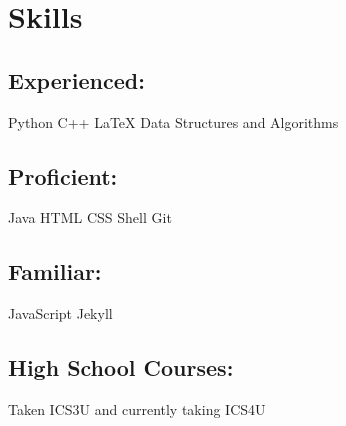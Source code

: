 \section{Skills}
\subsection{Experienced:}
Python \textbullet{} C++ \textbullet{} \LaTeX \textbullet{} Data Structures and Algorithms \\
\sectionsep

\sectionsep
\subsection{Proficient:}
Java \textbullet{} HTML \textbullet{} CSS \textbullet{} Shell \textbullet{} Git \\
\sectionsep

\subsection{Familiar:}
JavaScript \textbullet{} Jekyll \\
\sectionsep
\subsection{High School Courses:}
Taken ICS3U and currently taking ICS4U \\ 
\sectionsep